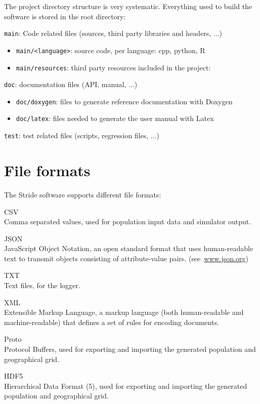 The project directory structure is very systematic.
Everything used to build the software is stored in the root directory:
\begin{compactitem}
    \item \texttt{main}: Code related files (sources, third party libraries and headers, ...)
      	\begin{itemize}
        		\item \texttt{main/<language>}: source code, per language: cpp, python, R
        		\item \texttt{main/resources}: third party resources included in the project:
        \end{itemize}
    \item \texttt{doc}: documentation files (API, manual, ...)
      	\begin{itemize}
        		\item \texttt{doc/doxygen}: files to generate reference documentation with Doxygen
        		\item \texttt{doc/latex}: files needed to generate the user manual with Latex
        \end{itemize}
    \item \texttt{test}: test related files (scripts, regression files, ...)
\end{compactitem}

\section{File formats}
\label{section:FileFormats}

The Stride software supports different file formats:
\begin{compactdesc}
	\item [CSV] \ \\
	Comma separated values, used for population input data and simulator output.
	\item [JSON] \ \\
	JavaScript Object Notation, an open standard format that uses human-readable text to transmit objects consisting of attribute-value pairs. 	 \mbox{(see \url{www.json.org})}
	\item [TXT] \ \\
	Text files, for the logger.
	\item [XML] \ \\
	Extensible Markup Language, a markup language (both human-readable and machine-readable) that defines a set of rules for encoding documents.
    \item [Proto] \ \\
    Protocol Buffers, used for exporting and importing the generated population and geographical grid.
	\item [HDF5] \ \\
	Hierarchical Data Format (5), used for exporting and importing the generated population and geographical grid.
\end{compactdesc}


